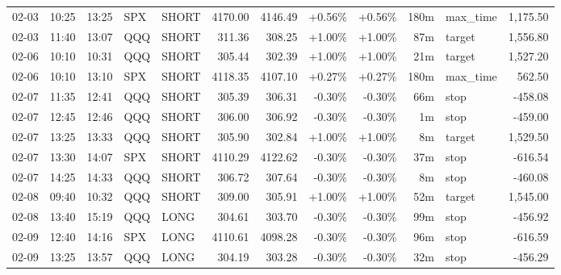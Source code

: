\documentclass[11pt,a4paper]{article}
\begin{document}
\begin{center}
\begin{longtable}{>{\color{txtmain}}l l l l l r r r r r >{\color{txtmain}}l r}
02-03 & 10:25 & 13:25 & SPX & SHORT & 4170.00 & 4146.49 & \textcolor{wingreen}{+0.56\%} & \textcolor{wingreen}{+0.56\%} & 180m & max\_time & \textcolor{wingreen}{1,175.50} \\
02-03 & 11:40 & 13:07 & QQQ & SHORT & 311.36 & 308.25 & \textcolor{wingreen}{+1.00\%} & \textcolor{wingreen}{+1.00\%} & 87m & target & \textcolor{wingreen}{1,556.80} \\
02-06 & 10:10 & 10:31 & QQQ & SHORT & 305.44 & 302.39 & \textcolor{wingreen}{+1.00\%} & \textcolor{wingreen}{+1.00\%} & 21m & target & \textcolor{wingreen}{1,527.20} \\
02-06 & 10:10 & 13:10 & SPX & SHORT & 4118.35 & 4107.10 & \textcolor{wingreen}{+0.27\%} & \textcolor{wingreen}{+0.27\%} & 180m & max\_time & \textcolor{wingreen}{562.50} \\
02-07 & 11:35 & 12:41 & QQQ & SHORT & 305.39 & 306.31 & \textcolor{lossred}{-0.30\%} & \textcolor{lossred}{-0.30\%} & 66m & stop & \textcolor{lossred}{-458.08} \\
02-07 & 12:45 & 12:46 & QQQ & SHORT & 306.00 & 306.92 & \textcolor{lossred}{-0.30\%} & \textcolor{lossred}{-0.30\%} & 1m & stop & \textcolor{lossred}{-459.00} \\
02-07 & 13:25 & 13:33 & QQQ & SHORT & 305.90 & 302.84 & \textcolor{wingreen}{+1.00\%} & \textcolor{wingreen}{+1.00\%} & 8m & target & \textcolor{wingreen}{1,529.50} \\
02-07 & 13:30 & 14:07 & SPX & SHORT & 4110.29 & 4122.62 & \textcolor{lossred}{-0.30\%} & \textcolor{lossred}{-0.30\%} & 37m & stop & \textcolor{lossred}{-616.54} \\
02-07 & 14:25 & 14:33 & QQQ & SHORT & 306.72 & 307.64 & \textcolor{lossred}{-0.30\%} & \textcolor{lossred}{-0.30\%} & 8m & stop & \textcolor{lossred}{-460.08} \\
02-08 & 09:40 & 10:32 & QQQ & SHORT & 309.00 & 305.91 & \textcolor{wingreen}{+1.00\%} & \textcolor{wingreen}{+1.00\%} & 52m & target & \textcolor{wingreen}{1,545.00} \\
02-08 & 13:40 & 15:19 & QQQ & LONG & 304.61 & 303.70 & \textcolor{lossred}{-0.30\%} & \textcolor{lossred}{-0.30\%} & 99m & stop & \textcolor{lossred}{-456.92} \\
02-09 & 12:40 & 14:16 & SPX & LONG & 4110.61 & 4098.28 & \textcolor{lossred}{-0.30\%} & \textcolor{lossred}{-0.30\%} & 96m & stop & \textcolor{lossred}{-616.59} \\
02-09 & 13:25 & 13:57 & QQQ & LONG & 304.19 & 303.28 & \textcolor{lossred}{-0.30\%} & \textcolor{lossred}{-0.30\%} & 32m & stop & \textcolor{lossred}{-456.29} \\

\end{longtable}
\end{center}
\end{document}
